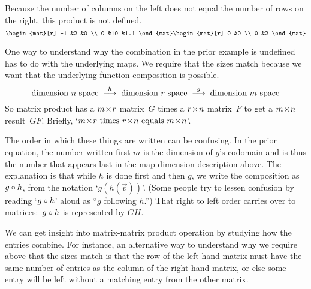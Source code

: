 \begin{example}
Because the number of columns on the left 
does not equal the number of rows on the right,
this product is not defined. 
\begin{equation*}
     \begin{mat}[r]
       -1  &2  &0  \\
        0  &10 &1.1
     \end{mat}
     \begin{mat}[r]
        0  &0  \\
        0  &2
     \end{mat}
\end{equation*}
\end{example}

One way to understand why the combination in the prior example is undefined
has to do with the underlying maps. 
We require that the sizes match 
because we want that the underlying
function composition is possible.
\begin{equation*}
  \text{dimension \( n \) space}
  \;\stackrel{h}{\longrightarrow}\;
  \text{dimension \( r \) space}
  \;\stackrel{g}{\longrightarrow}\;
  \text{dimension \( m \) space}
\end{equation*}
So matrix product has a $m \! \times \! r$ matrix~$G$
times a $r \! \times \! n$ matrix~$F$ to get a
$m \! \times \! n$ result~$GF$.
Briefly,
`$\nbym{m}{r}\text{\ times\ }\nbym{r}{n}\text{\ equals\ }\nbym{m}{n}$'.

\begin{remark}
The order in which these things are written can be confusing.
In the prior
equation, the number written first $m$ is the dimension of
$g$'s codomain and is thus the number that appears last in the
map dimension description above.
The explanation is that while $h$ is done first
and then $g$, 
we write the composition as $g\mathbin{\circ} h$,
from the notation `$g(h(\vec{v}))$'. 
(Some people try to lessen confusion by reading 
`$g\mathbin{\circ} h$' aloud as ``$g$ following $h$.'')
That right to left order carries over to matrices:~$g\mathbin{\circ} h$
is represented by $GH$.
\end{remark}

We can get insight into matrix-matrix product operation
by studying how the entries combine.
For instance, an alternative way to understand why we require above that
the sizes match
is that the row of the left-hand matrix must have the same number of
entries as the column of the right-hand matrix, or else some entry
will be left without a matching entry from the other matrix.

